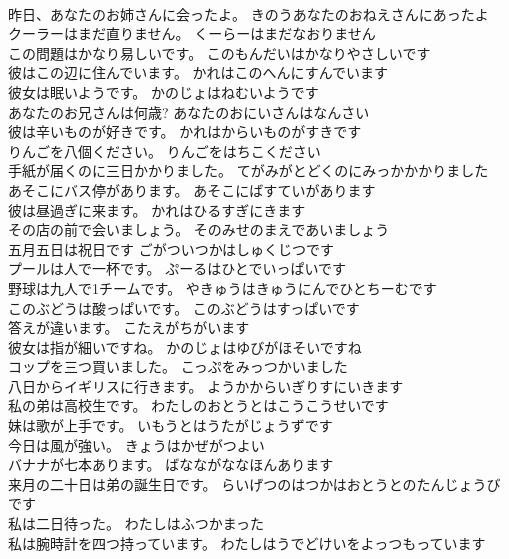 \documentclass[8pt]{extreport}
\begin{document}
\begin{CJK}{UTF8}{min}
\\	昨日、あなたのお姉さんに会ったよ。	きのうあなたのおねえさんにあったよ 
\\	クーラーはまだ直りません。	くーらーはまだなおりません 
\\	この問題はかなり易しいです。	このもんだいはかなりやさしいです 
\\	彼はこの辺に住んでいます。	かれはこのへんにすんでいます 
\\	彼女は眠いようです。	かのじょはねむいようです 
\\	あなたのお兄さんは何歳?	あなたのおにいさんはなんさい 
\\	彼は辛いものが好きです。	かれはからいものがすきです 
\\	りんごを八個ください。	りんごをはちこください 
\\	手紙が届くのに三日かかりました。	てがみがとどくのにみっかかかりました 
\\	あそこにバス停があります。	あそこにばすていがあります 
\\	彼は昼過ぎに来ます。	かれはひるすぎにきます 
\\	その店の前で会いましょう。	そのみせのまえであいましょう 
\\	五月五日は祝日です	ごがついつかはしゅくじつです 
\\	プールは人で一杯です。	ぷーるはひとでいっぱいです 
\\	野球は九人で1チームです。	やきゅうはきゅうにんでひとちーむです 
\\	このぶどうは酸っぱいです。	このぶどうはすっぱいです 
\\	答えが違います。	こたえがちがいます 
\\	彼女は指が細いですね。	かのじょはゆびがほそいですね 
\\	コップを三つ買いました。	こっぷをみっつかいました 
\\	八日からイギリスに行きます。	ようかからいぎりすにいきます 
\\	私の弟は高校生です。	わたしのおとうとはこうこうせいです 
\\	妹は歌が上手です。	いもうとはうたがじょうずです 
\\	今日は風が強い。	きょうはかぜがつよい 
\\	バナナが七本あります。	ばなながななほんあります 
\\	来月の二十日は弟の誕生日です。	らいげつのはつかはおとうとのたんじょうびです 
\\	私は二日待った。	わたしはふつかまった 
\\	私は腕時計を四つ持っています。	わたしはうでどけいをよっつもっています 

\end{CJK}
\end{document}
